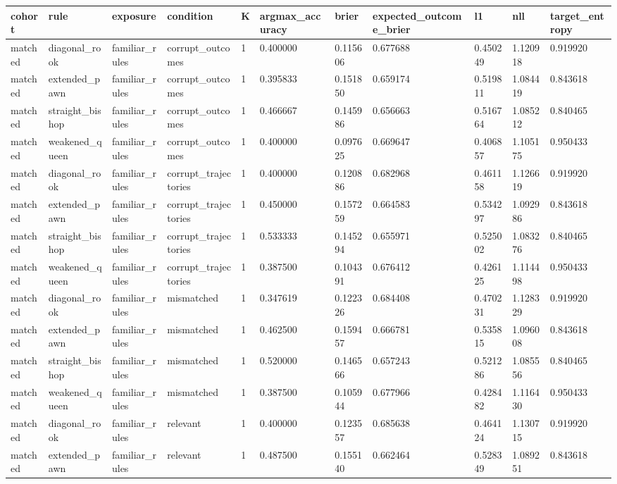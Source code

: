 \begin{tabular}{lllllllllll}
\hline
cohort & rule & exposure & condition & K & argmax\_accuracy & brier & expected\_outcome\_brier & l1 & nll & target\_entropy \\
\hline
matched & diagonal\_rook & familiar\_rules & corrupt\_outcomes & 1 & 0.400000 & 0.115606 & 0.677688 & 0.450249 & 1.120918 & 0.919920 \\
matched & extended\_pawn & familiar\_rules & corrupt\_outcomes & 1 & 0.395833 & 0.151850 & 0.659174 & 0.519811 & 1.084419 & 0.843618 \\
matched & straight\_bishop & familiar\_rules & corrupt\_outcomes & 1 & 0.466667 & 0.145986 & 0.656663 & 0.516764 & 1.085212 & 0.840465 \\
matched & weakened\_queen & familiar\_rules & corrupt\_outcomes & 1 & 0.400000 & 0.097625 & 0.669647 & 0.406857 & 1.105175 & 0.950433 \\
matched & diagonal\_rook & familiar\_rules & corrupt\_trajectories & 1 & 0.400000 & 0.120886 & 0.682968 & 0.461158 & 1.126619 & 0.919920 \\
matched & extended\_pawn & familiar\_rules & corrupt\_trajectories & 1 & 0.450000 & 0.157259 & 0.664583 & 0.534297 & 1.092986 & 0.843618 \\
matched & straight\_bishop & familiar\_rules & corrupt\_trajectories & 1 & 0.533333 & 0.145294 & 0.655971 & 0.525002 & 1.083276 & 0.840465 \\
matched & weakened\_queen & familiar\_rules & corrupt\_trajectories & 1 & 0.387500 & 0.104391 & 0.676412 & 0.426125 & 1.114498 & 0.950433 \\
matched & diagonal\_rook & familiar\_rules & mismatched & 1 & 0.347619 & 0.122326 & 0.684408 & 0.470231 & 1.128329 & 0.919920 \\
matched & extended\_pawn & familiar\_rules & mismatched & 1 & 0.462500 & 0.159457 & 0.666781 & 0.535815 & 1.096008 & 0.843618 \\
matched & straight\_bishop & familiar\_rules & mismatched & 1 & 0.520000 & 0.146566 & 0.657243 & 0.521286 & 1.085556 & 0.840465 \\
matched & weakened\_queen & familiar\_rules & mismatched & 1 & 0.387500 & 0.105944 & 0.677966 & 0.428482 & 1.116430 & 0.950433 \\
matched & diagonal\_rook & familiar\_rules & relevant & 1 & 0.400000 & 0.123557 & 0.685638 & 0.464124 & 1.130715 & 0.919920 \\
matched & extended\_pawn & familiar\_rules & relevant & 1 & 0.487500 & 0.155140 & 0.662464 & 0.528349 & 1.089251 & 0.843618 \\

\end{tabular}

